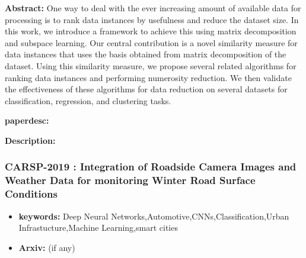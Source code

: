 \documentclass{article}
\begin{document}

\textbf{Abstract:} One way to deal with the ever increasing amount of available data for processing is to rank data instances by usefulness and reduce the dataset size. In this work, we introduce a framework to achieve this using matrix decomposition and subspace learning. Our central contribution is a novel similarity measure for data instances that uses the basis obtained from matrix decomposition of the dataset. Using this similarity measure, we propose several related algorithms for ranking data instances and performing numerosity reduction. We then validate the effectiveness of these algorithms for data reduction on several datasets for classification, regression, and clustering tasks.

\textbf{paperdesc:} 

\textbf{Description:} 



\newpage
\subsubsection{\textbf{CARSP-2019} : Integration of Roadside Camera Images and Weather Data for monitoring Winter Road Surface Conditions}
\begin{itemize}
\item \textbf{keywords:} Deep Neural Networks,Automotive,CNNs,Classification,Urban Infrastucture,Machine Learning,smart cities
\item \textbf{Arxiv:}  (if any)
\end{itemize}

\end{document}
